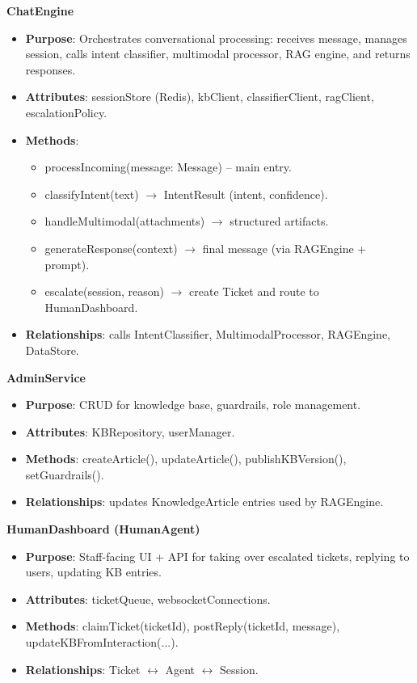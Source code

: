 \textbf{ChatEngine}

\begin{itemize}\setlength{\itemsep}{0pt}
\item \textbf{Purpose}: Orchestrates conversational processing: receives message, manages session, calls intent classifier, multimodal processor, RAG engine, and returns responses.
\item \textbf{Attributes}: sessionStore (Redis), kbClient, classifierClient, ragClient, escalationPolicy.
\item \textbf{Methods}:
\begin{itemize}\setlength{\itemsep}{0pt}
\item processIncoming(message: Message) -- main entry.
\item classifyIntent(text) $\rightarrow$ IntentResult (intent, confidence).
\item handleMultimodal(attachments) $\rightarrow$ structured artifacts.
\item generateResponse(context) $\rightarrow$ final message (via RAGEngine + prompt).
\item escalate(session, reason) $\rightarrow$ create Ticket and route to HumanDashboard.
\end{itemize}
\item \textbf{Relationships}: calls IntentClassifier, MultimodalProcessor, RAGEngine, DataStore.
\end{itemize}

\textbf{AdminService}

\begin{itemize}\setlength{\itemsep}{0pt}
\item \textbf{Purpose}: CRUD for knowledge base, guardrails, role management.
\item \textbf{Attributes}: KBRepository, userManager.
\item \textbf{Methods}: createArticle(), updateArticle(), publishKBVersion(), setGuardrails().
\item \textbf{Relationships}: updates KnowledgeArticle entries used by RAGEngine.
\end{itemize}

\textbf{HumanDashboard (HumanAgent)}

\begin{itemize}\setlength{\itemsep}{0pt}
\item \textbf{Purpose}: Staff-facing UI + API for taking over escalated tickets, replying to users, updating KB entries.
\item \textbf{Attributes}: ticketQueue, websocketConnections.
\item \textbf{Methods}: claimTicket(ticketId), postReply(ticketId, message), updateKBFromInteraction(...).
\item \textbf{Relationships}: Ticket $\leftrightarrow$ Agent $\leftrightarrow$ Session.
\end{itemize}

